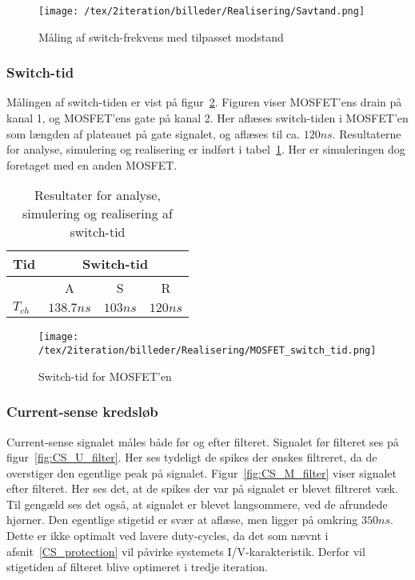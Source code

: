 \begin{figure}[H]
	\center
	\texttt{[image: /tex/2iteration/billeder/Realisering/Savtand.png]}
	\caption{Måling af switch-frekvens med tilpasset modstand}
	\label{fig:Savtand}
\end{figure} 
 

\subsubsection{Switch-tid}
\noindent Målingen af switch-tiden er vist på figur~\ref{fig:Realisering_MOSFET_switch_tid_2}. Figuren viser MOSFET'ens drain på kanal 1, og MOSFET'ens gate på kanal 2. Her aflæses switch-tiden i MOSFET'en som længden af plateauet på gate signalet, og aflæses til ca. $120ns$. Resultaterne for analyse, simulering og realisering er indført i tabel~\ref{tab:resultat_switch_tid_2}. Her er simuleringen dog foretaget med en anden MOSFET.

\begin{table}[H] 			
	\centering
	\begin{tabularx}{\textwidth}{|X|c|c|c|}
		\hline
		\textbf{Tid} & \multicolumn{3}{|c|}{\textbf{Switch-tid}} 										\\ \hline
		& A & S & R 									\\ \hline
		$T_{ch}$ & $138.7ns$ & $103ns$ & $120ns$ 									\\ \hline 
		
	\end{tabularx}
	\caption{Resultater for analyse, simulering og realisering af switch-tid}
	\label{tab:resultat_switch_tid_2}
\end{table}

 
\begin{figure}[H]
	\center
	\texttt{[image: /tex/2iteration/billeder/Realisering/MOSFET\_switch\_tid.png]}
	\caption{Switch-tid for MOSFET'en}
	\label{fig:Realisering_MOSFET_switch_tid_2}
\end{figure} 


\subsubsection{Current-sense kredsløb}
\noindent Current-sense signalet måles både før og efter filteret. Signalet før filteret ses på figur~\ref{fig:CS_U_filter}. Her ses tydeligt de spikes der ønskes filtreret, da de overstiger den egentlige peak på signalet. Figur~\ref{fig:CS_M_filter} viser signalet efter filteret. Her ses det, at de spikes der var på signalet er blevet filtreret væk. Til gengæld ses det også, at signalet er blevet langsommere, ved de afrundede hjørner. Den egentlige stigetid er svær at aflæse, men ligger på omkring $350ns$. Dette er ikke optimalt ved lavere duty-cycles, da det som nævnt i afsnit~\ref{CS_protection} vil påvirke systemets I/V-karakteristik. Derfor vil stigetiden af filteret blive optimeret i tredje iteration.

